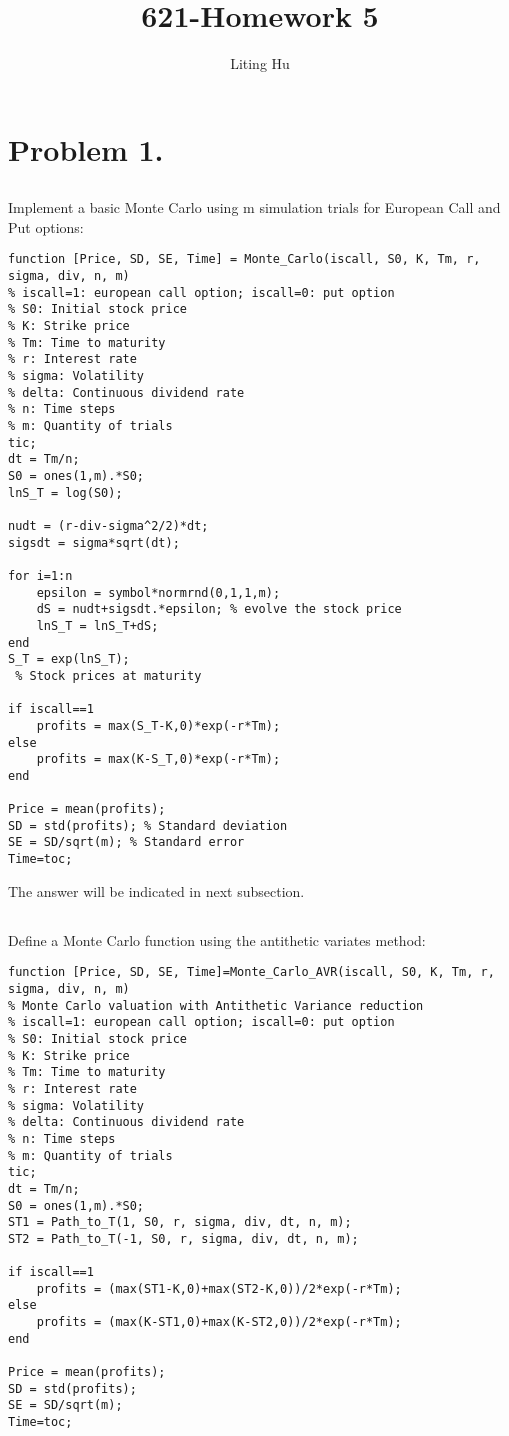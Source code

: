 \documentclass{article}
\begin{document}
  
\title{621-Homework 5}
\author{Liting Hu}

\maketitle

\section{Problem 1.}
\subsection{}
Implement a basic Monte Carlo using m simulation trials for European Call and Put options:
\begin{verbatim}
function [Price, SD, SE, Time] = Monte_Carlo(iscall, S0, K, Tm, r, sigma, div, n, m)
% iscall=1: european call option; iscall=0: put option
% S0: Initial stock price
% K: Strike price
% Tm: Time to maturity
% r: Interest rate
% sigma: Volatility
% delta: Continuous dividend rate
% n: Time steps
% m: Quantity of trials
tic;
dt = Tm/n;
S0 = ones(1,m).*S0;
lnS_T = log(S0);

nudt = (r-div-sigma^2/2)*dt;
sigsdt = sigma*sqrt(dt);

for i=1:n
    epsilon = symbol*normrnd(0,1,1,m);
    dS = nudt+sigsdt.*epsilon; % evolve the stock price
    lnS_T = lnS_T+dS;
end
S_T = exp(lnS_T);
 % Stock prices at maturity

if iscall==1
    profits = max(S_T-K,0)*exp(-r*Tm);
else
    profits = max(K-S_T,0)*exp(-r*Tm);
end

Price = mean(profits);
SD = std(profits); % Standard deviation
SE = SD/sqrt(m); % Standard error
Time=toc;
\end{verbatim}
The answer will be indicated in next subsection.

\subsection{}

Define a Monte Carlo function using the antithetic variates method:
\begin{verbatim}
function [Price, SD, SE, Time]=Monte_Carlo_AVR(iscall, S0, K, Tm, r, sigma, div, n, m)
% Monte Carlo valuation with Antithetic Variance reduction
% iscall=1: european call option; iscall=0: put option
% S0: Initial stock price
% K: Strike price
% Tm: Time to maturity
% r: Interest rate
% sigma: Volatility
% delta: Continuous dividend rate
% n: Time steps
% m: Quantity of trials
tic;
dt = Tm/n;
S0 = ones(1,m).*S0;
ST1 = Path_to_T(1, S0, r, sigma, div, dt, n, m);
ST2 = Path_to_T(-1, S0, r, sigma, div, dt, n, m);

if iscall==1
    profits = (max(ST1-K,0)+max(ST2-K,0))/2*exp(-r*Tm);
else
    profits = (max(K-ST1,0)+max(K-ST2,0))/2*exp(-r*Tm);
end

Price = mean(profits);
SD = std(profits);
SE = SD/sqrt(m);
Time=toc;
\end{verbatim}
\end{document}
